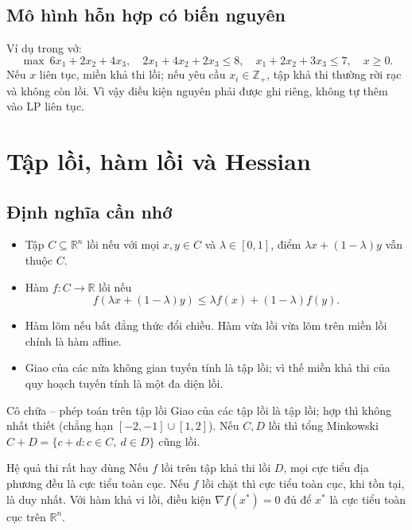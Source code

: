 \documentclass[11pt,a4paper]{article}
\newcommand{\R}{\mathbb{R}}
\newcommand{\grad}{\nabla}
\begin{document}
\subsection{Mô hình hỗn hợp có biến nguyên}
Ví dụ trong vở:
\[
\max\ 6x_1+2x_2+4x_3,\quad
2x_1+4x_2+2x_3\le8,\quad
x_1+2x_2+3x_3\le7,\quad x\ge0.
\]
Nếu \(x\) liên tục, miền khả thi lồi; nếu yêu cầu \(x_i\in\mathbb Z_+\), tập khả thi thường rời rạc và không còn lồi. Vì vậy điều kiện nguyên phải được ghi riêng, không tự thêm vào LP liên tục.

\section{Tập lồi, hàm lồi và Hessian}
\subsection{Định nghĩa cần nhớ}
\begin{itemize}
\item Tập \(C\subseteq\R^n\) lồi nếu với mọi \(x,y\in C\) và \(\lambda\in[0,1]\), điểm \(\lambda x+(1-\lambda)y\) vẫn thuộc \(C\).
\item Hàm \(f:C\to\R\) lồi nếu
\[
f(\lambda x+(1-\lambda)y)\le \lambda f(x)+(1-\lambda)f(y).
\]
\item Hàm lõm nếu bất đẳng thức đổi chiều. Hàm vừa lồi vừa lõm trên miền lồi chính là hàm affine.
\item Giao của các nửa không gian tuyến tính là tập lồi; vì thế miền khả thi của quy hoạch tuyến tính là một đa diện lồi.
\end{itemize}
\begin{answerbox}{Cô chữa -- phép toán trên tập lồi}
Giao của các tập lồi là tập lồi; hợp thì không nhất thiết (chẳng hạn \([-2,-1]\cup[1,2]\)). Nếu \(C,D\) lồi thì tổng Minkowski \(C+D=\{c+d:c\in C,\ d\in D\}\) cũng lồi.
\end{answerbox}

\begin{keybox}{Hệ quả thi rất hay dùng}
Nếu \(f\) lồi trên tập khả thi lồi \(D\), mọi cực tiểu địa phương đều là cực tiểu toàn cục. Nếu \(f\) lồi chặt thì cực tiểu toàn cục, khi tồn tại, là duy nhất. Với hàm khả vi lồi, điều kiện \(\grad f(x^\ast)=0\) đủ để \(x^\ast\) là cực tiểu toàn cục trên \(\R^n\).
\end{keybox}
\end{document}
